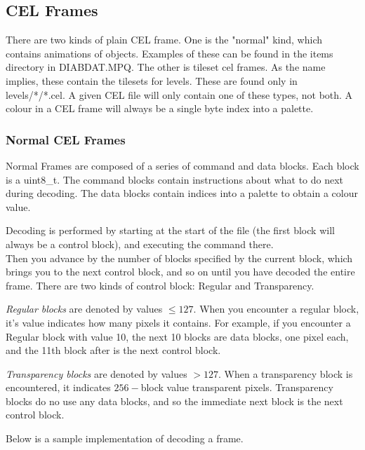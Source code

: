 	\subsection{CEL Frames}
	There are two kinds of plain CEL frame. One is the "normal" kind, which contains animations of objects. Examples of these can be found in the items directory in DIABDAT.MPQ. The other is tileset cel frames. As the name implies, these contain the tilesets for levels. These are found only in levels/*/*.cel.
	A given CEL file will only contain one of these types, not both.
A colour in a CEL frame will always be a single byte index into a palette.

	\subsubsection{Normal CEL Frames}
	Normal Frames are composed of a series of command and data blocks.
	Each block is a uint8\_t.
	The command blocks contain instructions about what to do next during decoding. The data blocks contain indices into a palette to obtain a colour value.
	
	Decoding is performed by starting at the start of the file (the first block will always be a control block), and executing the command there. 
	\\Then you advance by the number of blocks specified by the current block, which brings you to the next control block, and so on until you have decoded the entire frame. There are two kinds of control block: Regular and Transparency.
	
	\emph{Regular blocks} are denoted by values $\leq 127$. When you encounter a regular block, it's value indicates how many pixels it contains. For example, if you encounter a Regular block with value 10, the next 10 blocks are data blocks, one pixel each, and the 11th block after is the next control block.
	
	\emph{Transparency blocks} are denoted by values $> 127$. When a transparency block is encountered, it indicates $256-$block value transparent pixels. Transparency blocks do no use any data blocks, and so the immediate next block is the next control block.
	
	Below is a sample implementation of decoding a frame.
	
